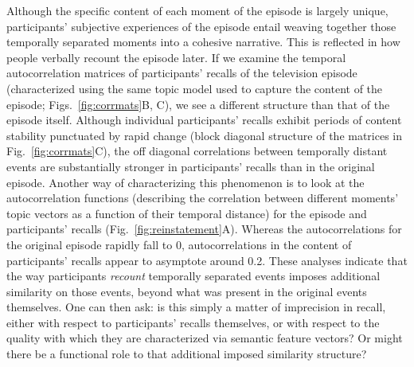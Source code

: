 \documentclass{article}
\begin{document}
Although the specific content of each moment of the episode is largely unique, participants' subjective experiences of the episode entail weaving together those temporally separated moments into a cohesive narrative.  This is reflected in how people verbally recount the episode later.  If we examine the temporal autocorrelation matrices of participants' recalls of the television episode (characterized using the same topic model used to capture the content of the episode; Figs.~\ref{fig:corrmats}B, C), we see a different structure than that of the episode itself.  Although individual participants' recalls exhibit periods of content stability punctuated by rapid change (block diagonal structure of the matrices in Fig.~\ref{fig:corrmats}C), the off diagonal correlations between temporally distant events are substantially stronger in participants' recalls than in the original episode.  Another way of characterizing this phenomenon is to look at the autocorrelation functions (describing the correlation between different moments' topic vectors as a function of their temporal distance) for the episode and participants' recalls (Fig.~\ref{fig:reinstatement}A).  Whereas the autocorrelations for the original episode rapidly fall to 0, autocorrelations in the content of participants' recalls appear to asymptote around 0.2.  These analyses indicate that the way participants \textit{recount} temporally separated events imposes additional similarity on those events, beyond what was present in the original events themselves.  One can then ask: is this simply a matter of imprecision in recall, either with respect to participants' recalls themselves, or with respect to the quality with which they are characterized via semantic feature vectors?  Or might there be a functional role to that additional imposed similarity structure?
\end{document}
